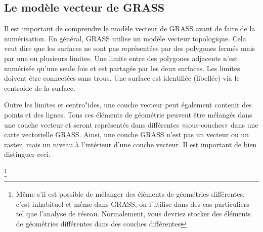 \subsection{Le modèle vecteur de GRASS}\label{label_vectmodel}
Il est important de comprendre le modèle vecteur de GRASS avant de faire de la numérisation. En général, GRASS utilise un modèle vecteur topologique. Cela veut dire que les surfaces ne sont pas représentées par des polygones fermés mais par une ou plusieurs limites. Une limite entre des polygones adjacents n'est numérisée qu'une seule fois et est partagée par les deux surfaces. Les limites doivent être connectées sans trous. Une surface est identifiée (libellée) via le centroide de la surface.

	
Outre les limites et centro"ides, une couche vecteur peut également contenir des points et des lignes. Tous ces éléments de géométrie peuvent être mélangés dans une couche vecteur et seront représentés dans différentes «sous-couches» dans une carte vectorielle GRASS. Ainsi, une couche GRASS n'est pas un vecteur ou un raster, mais un niveau à l'intérieur d'une couche vecteur. Il est important de bien distinguer ceci.

\footnote{Même s'il est possible de mélanger des éléments de géométries différentes, c'est inhabituel et même dans GRASS, on l'utilise dans des cas particuliers tel que l'analyse de réseau. Normalement, vous devriez stocker des éléments de géométries différentes dans des couches différentes}

